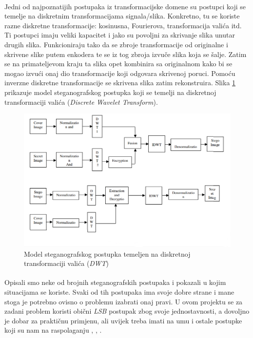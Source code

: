 \documentclass[times, utf8, seminar, numeric]{fer}
\begin{document}
\paragraph{}
Jedni od najpoznatijih postupaka iz transformacijske domene su postupci koji se temelje na diskretnim transformacijama signala/slika. Konkretno, tu se koriste razne diskretne transformacije: kosinusna, Fourierova, transformacija valića itd. Ti postupci imaju veliki kapacitet i jako su povoljni za skrivanje slika unutar drugih slika. Funkcioniraju tako da se zbroje transformacije od originalne i skrivene slike putem enkodera te se iz tog zbroja izvuče slika koja se šalje. Zatim se na primateljevom kraju ta slika opet kombinira sa originalnom kako bi se mogao izvući onaj dio transformacije koji odgovara skrivenoj poruci. Pomoću inverzne diskretne transformacije se skrivena slika zatim rekonstruira. Slika \ref{dwt} prikazuje model steganografskog postupka koji se temelji na diskretnoj transformaciji valića (\textit{Discrete Wavelet Transform}).
\begin{figure}
\caption{Model steganografskog postupka temeljen na diskretnoj transformaciji valića (\textit{DWT})}
\label{dwt}
\centerline{\includegraphics[scale=0.6]{images/dwt.png}}
\end{figure}
\paragraph{}
Opisali smo neke od brojnih steganografskih postupaka i pokazali u kojim situacijama se koriste. Svaki od tih postupaka ima svoje dobre strane i mane stoga je potrebno ovisno o problemu izabrati onaj pravi. U ovom projektu se za zadani problem koristi obični \textit{LSB} postupak zbog svoje jednostavnosti, a dovoljno je dobar za praktičnu primjenu, ali uvijek treba imati na umu i ostale postupke koji su nam na raspolaganju \cite{ijast_steg}, \cite{ijcses_steg}, \cite{ijtre_steg}.
\end{document}
